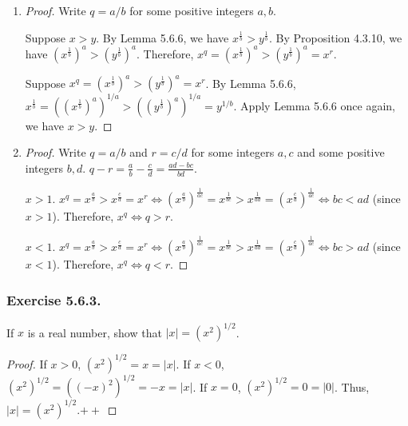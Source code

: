 \documentclass[12pt, letter]{article}
\begin{document}
\begin{enumerate}[label=(\alph*)]
\begin{proof}
        \begin{equation*}
            \begin{aligned}
                x^{-q}&=x^{-\frac{a}{b}}\\
                &=(x^{\frac{1}{b}})^{-a}\\
                &=\frac{1}{(x^{\frac{1}{b}})^a}\\
                &=\frac{1}{x^q}.
            \end{aligned}
        \end{equation*}
    \end{proof}
    \item \begin{proof}
        Write $q=a/b$ for some positive integers $a,b$. 
        
        Suppose $x>y$. By Lemma 5.6.6, we have $x^{\frac{1}{b}}>y^{\frac{1}{b}}$. By Proposition 4.3.10, we have $(x^{\frac{1}{b}})^a>(y^{\frac{1}{b}})^a$. Therefore, $x^q=(x^{\frac{1}{b}})^a>(y^{\frac{1}{b}})^a=x^r$.

        Suppose $x^q=(x^{\frac{1}{b}})^a>(y^{\frac{1}{b}})^a=x^r$. By Lemma 5.6.6, $x^{\frac{1}{b}}=((x^{\frac{1}{b}})^a)^{1/a}>((y^{\frac{1}{b}})^a)^{1/a}=y^{1/b}$. Apply Lemma 5.6.6 once again, we have $x>y$.
    \end{proof}
    \item \begin{proof}
         Write $q=a/b$ and $r=c/d$ for some integers $a,c$ and some positive integers $b,d$. $q-r=\frac{a}{b}-\frac{c}{d}=\frac{ad-bc}{bd}$. 

         $x>1$. $x^q=x^{\frac{a}{b}}>x^{\frac{c}{d}}=x^r\iff (x^{\frac{a}{b}})^{\frac{1}{ac}}=x^{\frac{1}{bc}}>x^{\frac{1}{ad}}=(x^{\frac{c}{d}})^\frac{1}{ac}\iff bc<ad$ (since $x>1$). Therefore, $x^q\iff q>r$. 

         $x<1$. $x^q=x^{\frac{a}{b}}>x^{\frac{c}{d}}=x^r\iff (x^{\frac{a}{b}})^{\frac{1}{ac}}=x^{\frac{1}{bc}}>x^{\frac{1}{ad}}=(x^{\frac{c}{d}})^\frac{1}{ac}\iff bc>ad$ (since $x<1$). Therefore, $x^q\iff q<r$. 
    \end{proof}
\end{enumerate}
\subsubsection*{Exercise 5.6.3.}
If $x$ is a real number, show that $|x|=(x^2)^{1/2}$.
\begin{proof}
    If $x>0$, $(x^2)^{1/2}=x=|x|$. If $x<0$, $(x^2)^{1/2}=((-x)^2)^{1/2}=-x=|x|$. If $x=0$, $(x^2)^{1/2}=0=|0|$. Thus, $|x|=(x^2)^{1/2}$.$\mathtt{++}$ 
\end{proof}
\end{document}
